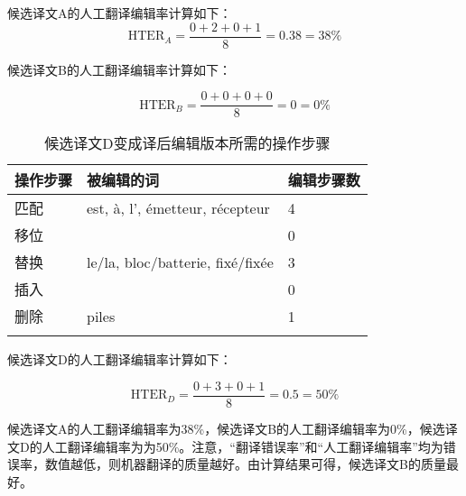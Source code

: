 \documentclass[output=paper]{langscibook}
\begin{document}
候选译文A的人工翻译编辑率计算如下：
\begin{equation}
\text{HTER}_A=\frac{0+2+0+1}{8}=0.38=38\%
\end{equation}


\begin{table}[H]
\caption{候选译文B变成译后编辑版本所需的操作步骤}
\label{tab:rossi:9}
\end{table}

候选译文B的人工翻译编辑率计算如下：

\begin{equation}
\text{HTER}_B=\frac{0+0+0+0} 8=0=0\%
\end{equation}



\begin{table}[H]
\begin{tabularx}{\textwidth}{llY}
\lsptoprule
{操作步骤} & {被编辑的词} & {编辑步骤数}\\
\midrule
匹配 & est, à, l’, émetteur, récepteur & 4\\
移位 &  & 0\\
替换 & le/la, bloc/batterie, fixé/fixée & 3\\
插入 &  & 0\\
删除 & piles & 1\\
\lspbottomrule
\end{tabularx}
\caption{候选译文D变成译后编辑版本所需的操作步骤}
\label{tab:rossi:10}
\end{table}

候选译文D的人工翻译编辑率计算如下：

\begin{equation}
\text{HTER}_D=\frac{0+3+0+1} 8=0.5=50\%
\end{equation}

候选译文A的人工翻译编辑率为38\%，候选译文B的人工翻译编辑率为0\%，候选译文D的人工翻译编辑率为为50\%。注意，“翻译错误率”和“人工翻译编辑率”均为错误率，数值越低，则机器翻译的质量越好。由计算结果可得，候选译文B的质量最好。
\end{document}
